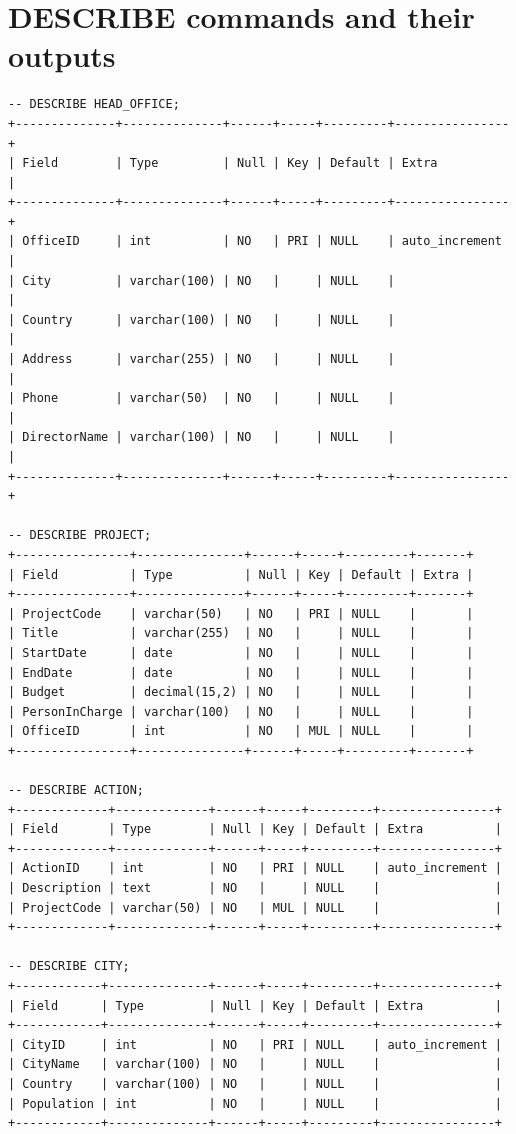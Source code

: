 \documentclass[11pt,a4paper]{article}
\begin{document}
\section{DESCRIBE commands and their outputs}
\begin{Verbatim}
-- DESCRIBE HEAD_OFFICE;
+--------------+--------------+------+-----+---------+----------------+
| Field        | Type         | Null | Key | Default | Extra          |
+--------------+--------------+------+-----+---------+----------------+
| OfficeID     | int          | NO   | PRI | NULL    | auto_increment |
| City         | varchar(100) | NO   |     | NULL    |                |
| Country      | varchar(100) | NO   |     | NULL    |                |
| Address      | varchar(255) | NO   |     | NULL    |                |
| Phone        | varchar(50)  | NO   |     | NULL    |                |
| DirectorName | varchar(100) | NO   |     | NULL    |                |
+--------------+--------------+------+-----+---------+----------------+

-- DESCRIBE PROJECT;
+----------------+---------------+------+-----+---------+-------+
| Field          | Type          | Null | Key | Default | Extra |
+----------------+---------------+------+-----+---------+-------+
| ProjectCode    | varchar(50)   | NO   | PRI | NULL    |       |
| Title          | varchar(255)  | NO   |     | NULL    |       |
| StartDate      | date          | NO   |     | NULL    |       |
| EndDate        | date          | NO   |     | NULL    |       |
| Budget         | decimal(15,2) | NO   |     | NULL    |       |
| PersonInCharge | varchar(100)  | NO   |     | NULL    |       |
| OfficeID       | int           | NO   | MUL | NULL    |       |
+----------------+---------------+------+-----+---------+-------+

-- DESCRIBE ACTION;
+-------------+-------------+------+-----+---------+----------------+
| Field       | Type        | Null | Key | Default | Extra          |
+-------------+-------------+------+-----+---------+----------------+
| ActionID    | int         | NO   | PRI | NULL    | auto_increment |
| Description | text        | NO   |     | NULL    |                |
| ProjectCode | varchar(50) | NO   | MUL | NULL    |                |
+-------------+-------------+------+-----+---------+----------------+

-- DESCRIBE CITY;
+------------+--------------+------+-----+---------+----------------+
| Field      | Type         | Null | Key | Default | Extra          |
+------------+--------------+------+-----+---------+----------------+
| CityID     | int          | NO   | PRI | NULL    | auto_increment |
| CityName   | varchar(100) | NO   |     | NULL    |                |
| Country    | varchar(100) | NO   |     | NULL    |                |
| Population | int          | NO   |     | NULL    |                |
+------------+--------------+------+-----+---------+----------------+


\end{Verbatim}
\end{document}
